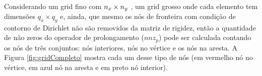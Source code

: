 Considerando um grid fino com $n_x \times n_y$ , um grid grosso onde cada elemento tem dimensões $q_x \times q_y$  e, ainda, que mesmo os nós de fronteira com condição de contorno de Dirichlet não são removidos da matriz de rigidez, então a quantidade de não zeros do operador de prolongamento ($nnz_p$) pode ser calculada contando os nós de três conjuntos:  nós interiores, nós no vértice e os nós na aresta.  A Figura \ref{fig:gridCompleto} mostra cada um desse tipo de nós (em vermelho nó no vértice, em azul nó na aresta e em preto nó interior).


